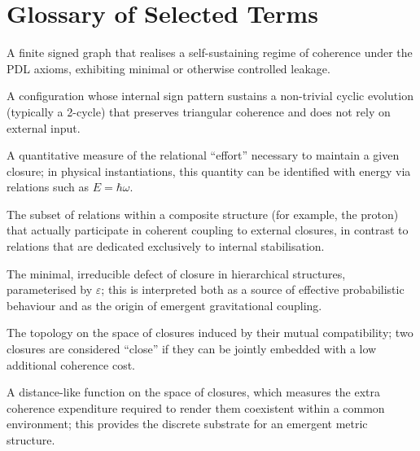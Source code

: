 \documentclass[11pt,a4paper]{article}
\begin{document}
\section{Glossary of Selected Terms}
\label{app:glossary}

\begin{description}[style=nextline,leftmargin=1.5cm]
  \item[Closure] A finite signed graph that realises a self-sustaining regime of
  coherence under the PDL axioms, exhibiting minimal or otherwise controlled
  leakage.

  \item[Logical stationary regime] A configuration whose internal sign
  pattern sustains a non-trivial cyclic evolution (typically a 2-cycle)
  that preserves triangular coherence and does not rely on external input.

  \item[Coherence cost] A quantitative measure of the relational “effort”
  necessary to maintain a given closure; in physical instantiations, this
  quantity can be identified with energy via relations such as \(E = \hbar \omega\).

  \item[Active surface] The subset of relations within a composite structure
  (for example, the proton) that actually participate in coherent coupling to
  external closures, in contrast to relations that are dedicated exclusively
  to internal stabilisation.

  \item[Leakage] The minimal, irreducible defect of closure in hierarchical
  structures, parameterised by \(\varepsilon\); this is interpreted both as
  a source of effective probabilistic behaviour and as the origin of emergent
  gravitational coupling.

  \item[Coexistence topology] The topology on the space of closures induced by
  their mutual compatibility; two closures are considered “close” if they can
  be jointly embedded with a low additional coherence cost.

  \item[Coherence-cost pseudo-metric] A distance-like function on the space of
  closures, which measures the extra coherence expenditure required to render
  them coexistent within a common environment; this provides the discrete
  substrate for an emergent metric structure.

\end{description}
\end{document}
